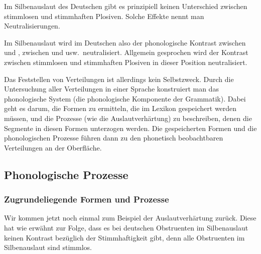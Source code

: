 Im Silbenauslaut des Deutschen gibt es prinzipiell keinen Unterschied zwischen stimmlosen und stimmhaften Plosiven.
Solche Effekte nennt man Neutralisierungen.


Im Silbenauslaut wird im Deutschen also der phonologische Kontrast zwischen \textipa{[g]} und \textipa{[k]}, zwischen \textipa{[d]} und \textipa{[t]} usw.\ neutralisiert.
Allgemein gesprochen wird der Kontrast zwischen stimmlosen und stimmhaften Plosiven in dieser Position neutralisiert.

Das Feststellen von Verteilungen ist allerdings kein Selbstzweck.
Durch die Untersuchung aller Verteilungen in einer Sprache konstruiert man das phonologische System (die phonologische Komponente der Grammatik).
Dabei geht es darum, die Formen zu ermitteln, die im Lexikon gespeichert werden müssen, und die Prozesse (wie die Auslautverhärtung) zu beschreiben, denen die Segmente in diesen Formen unterzogen werden.
Die gespeicherten Formen und die phonologischen Prozesse führen dann zu den phonetisch beobachtbaren Verteilungen an der Oberfläche.

\subsection{Phonologische Prozesse}
\label{sec:pholfeat}
\label{sec:ur}

\subsubsection{Zugrundeliegende Formen und Prozesse}

Wir kommen jetzt noch einmal zum Beispiel der Auslautverhärtung zurück.
Diese hat wie erwähnt zur Folge, dass es bei deutschen Obstruenten im Silbenauslaut keinen Kontrast bezüglich der Stimmhaftigkeit gibt, denn alle Obstruenten im Silbenauslaut sind stimmlos.

